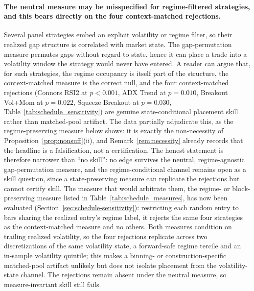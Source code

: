 \documentclass[risks,article,submit,pdftex,oneauthor]{Definitions/mdpi}
\begin{document}
\paragraph{The neutral measure may be misspecified for regime-filtered strategies, and
this bears directly on the four context-matched rejections.} Several panel strategies
embed an explicit volatility or regime filter, so their realized gap structure is
correlated with market state. The gap-permutation measure permutes gaps without regard
to state, hence it can place a trade into a volatility window the strategy would never
have entered. A reader can argue that, for such strategies, the regime occupancy is
itself part of the structure, the context-matched measure is the correct null, and the
four context-matched rejections (Connors RSI2 at $p<0.001$, ADX Trend at $p=0.010$,
Breakout Vol+Mom at $p=0.022$, Squeeze Breakout at $p=0.030$,
Table~\ref{tab:schedule_sensitivity}) are genuine state-conditional placement skill
rather than matched-pool artifact. The data partially adjudicate this, as the regime-preserving measure below shows: it is
exactly the non-necessity of Proposition~\ref{prop:nonsuff}(ii), and
Remark~\ref{rem:necessity} already records that the headline is a falsification, not a
certification. The honest statement is therefore narrower than ``no skill'': no edge
survives the neutral, regime-agnostic gap-permutation measure, and the
regime-conditional channel remains open as a skill question, since a state-preserving measure can replicate the rejections but cannot certify skill. The measure that would arbitrate them, the regime-
or block-preserving measure listed in Table~\ref{tab:schedule_measures}, has now been
evaluated (Section~\ref{sec:schedule-sensitivity}): restricting each random entry to
bars sharing the realized entry's regime label, it rejects the same four strategies as
the context-matched measure and no others. Both measures condition on trailing realized volatility, so the four rejections replicate
across two discretizations of the same volatility state, a forward-safe regime tercile and an
in-sample volatility quintile; this makes a binning- or construction-specific matched-pool
artifact unlikely but does not isolate placement from the volatility-state channel. The
rejections remain absent under the neutral measure, so measure-invariant skill still fails.
\end{document}
